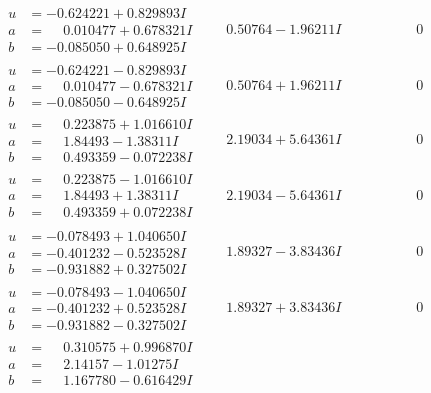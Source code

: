 \documentclass[1p]{elsarticle_modified}
\theoremstyle{definition}
\begin{document}
$$\begin{array}{c|c|c}
\begin{aligned}
u &= -0.624221 + 0.829893 I \\
a &= \phantom{-}0.010477 + 0.678321 I \\
b &= -0.085050 + 0.648925 I\end{aligned}
 & \phantom{-}0.50764 - 1.96211 I & \phantom{-0.000000 } 0 \\ \hline\begin{aligned}
u &= -0.624221 - 0.829893 I \\
a &= \phantom{-}0.010477 - 0.678321 I \\
b &= -0.085050 - 0.648925 I\end{aligned}
 & \phantom{-}0.50764 + 1.96211 I & \phantom{-0.000000 } 0 \\ \hline\begin{aligned}
u &= \phantom{-}0.223875 + 1.016610 I \\
a &= \phantom{-}1.84493 - 1.38311 I \\
b &= \phantom{-}0.493359 - 0.072238 I\end{aligned}
 & \phantom{-}2.19034 + 5.64361 I & \phantom{-0.000000 } 0 \\ \hline\begin{aligned}
u &= \phantom{-}0.223875 - 1.016610 I \\
a &= \phantom{-}1.84493 + 1.38311 I \\
b &= \phantom{-}0.493359 + 0.072238 I\end{aligned}
 & \phantom{-}2.19034 - 5.64361 I & \phantom{-0.000000 } 0 \\ \hline\begin{aligned}
u &= -0.078493 + 1.040650 I \\
a &= -0.401232 - 0.523528 I \\
b &= -0.931882 + 0.327502 I\end{aligned}
 & \phantom{-}1.89327 - 3.83436 I & \phantom{-0.000000 } 0 \\ \hline\begin{aligned}
u &= -0.078493 - 1.040650 I \\
a &= -0.401232 + 0.523528 I \\
b &= -0.931882 - 0.327502 I\end{aligned}
 & \phantom{-}1.89327 + 3.83436 I & \phantom{-0.000000 } 0 \\ \hline\begin{aligned}
u &= \phantom{-}0.310575 + 0.996870 I \\
a &= \phantom{-}2.14157 - 1.01275 I \\
b &= \phantom{-}1.167780 - 0.616429 I\end{aligned}

\end{array}$$
\end{document}
